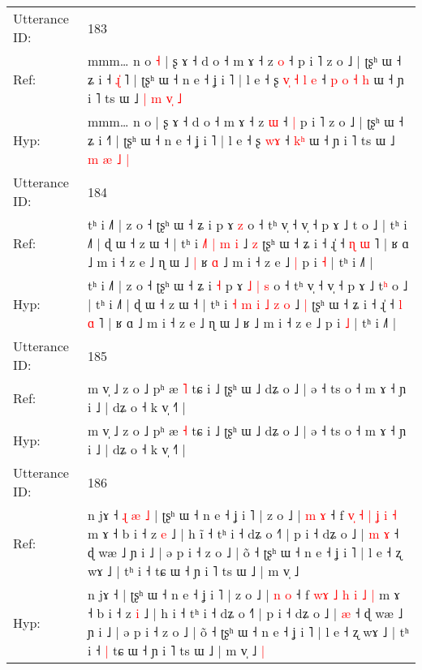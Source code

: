 \documentclass[10pt]{article}
\DeclareRobustCommand{\hl}[1]{{\textcolor{red}{#1}}}
\begin{document}
\begin{longtable}{ll}
 \\
\midrule
Utterance ID: & 183 \\
Ref: & mmm… n o\hl{ }\hl{˧} | ʂ ɤ ˧ d o ˧ m ɤ ˧ z \hl{o} ˧\hl{}\hl{} p i ˥ z o ˩ | ʈʂʰ ɯ ˧ ʑ i ˧\hl{ }\hl{ɻ}\hl{̍}\hl{ }˥ | ʈʂʰ ɯ ˧ n e ˧ ʝ i ˥ | l e ˧ ʂ\hl{ }\hl{v}\hl{̩}\hl{ }\hl{˧} \hl{l}\hl{ }\hl{e} ˧\hl{ }\hl{p}\hl{ }\hl{o} \hl{˧}\hl{ }\hl{h} ɯ ˧ ɲ i ˥ ts ɯ ˩ \hl{|} \hl{m} \hl{v}\hl{̩} \hl{˩}
 \\
Hyp: & mmm… n o\hl{}\hl{} | ʂ ɤ ˧ d o ˧ m ɤ ˧ z \hl{ɯ} ˧\hl{ }\hl{|} p i ˥ z o ˩ | ʈʂʰ ɯ ˧ ʑ i ˧\hl{}\hl{}\hl{}\hl{}˥ | ʈʂʰ ɯ ˧ n e ˧ ʝ i ˥ | l e ˧ ʂ\hl{}\hl{}\hl{}\hl{}\hl{} \hl{}\hl{w}\hl{ɤ} ˧\hl{}\hl{}\hl{}\hl{} \hl{}\hl{k}\hl{ʰ} ɯ ˧ ɲ i ˥ ts ɯ ˩ \hl{m} \hl{æ} \hl{}\hl{˩} \hl{|}
 \\
\midrule
Utterance ID: & 184 \\
Ref: & tʰ i ˩˥ | z o ˧ ʈʂʰ ɯ ˧ ʑ i\hl{}\hl{} p ɤ\hl{}\hl{}\hl{}\hl{} \hl{z} o ˧ tʰ v̩ ˧ v̩ ˧ p ɤ ˩ t\hl{} o ˩ | tʰ i ˩˥ | ɖ ɯ ˧ z ɯ ˧ | tʰ i\hl{}\hl{} \hl{}\hl{˩}\hl{˥} \hl{|} \hl{m} \hl{i} ˩ \hl{z} ʈʂʰ ɯ ˧ ʑ i ˧ ɻ̍ ˧ \hl{ɳ} \hl{ɯ} ˥ | ʁ ɑ ˩ m i ˧ z e ˩ ɳ ɯ ˩\hl{ }\hl{|} ʁ\hl{ }\hl{ɑ} ˩ m i ˧ z e ˩\hl{ }\hl{|} p i \hl{˧} | tʰ i ˩˥ |
 \\
Hyp: & tʰ i ˩˥ | z o ˧ ʈʂʰ ɯ ˧ ʑ i\hl{ }\hl{˧} p ɤ\hl{ }\hl{˩}\hl{ }\hl{|} \hl{s} o ˧ tʰ v̩ ˧ v̩ ˧ p ɤ ˩ t\hl{ʰ} o ˩ | tʰ i ˩˥ | ɖ ɯ ˧ z ɯ ˧ | tʰ i\hl{ }\hl{˧} \hl{m}\hl{ }\hl{i} \hl{˩} \hl{z} \hl{o} ˩ \hl{|} ʈʂʰ ɯ ˧ ʑ i ˧ ɻ̍ ˧ \hl{l} \hl{ɑ} ˥ | ʁ ɑ ˩ m i ˧ z e ˩ ɳ ɯ ˩\hl{}\hl{} ʁ\hl{}\hl{} ˩ m i ˧ z e ˩\hl{}\hl{} p i \hl{˩} | tʰ i ˩˥ |
 \\
\midrule
Utterance ID: & 185 \\
Ref: & m v̩ ˩ z o ˩ pʰ æ \hl{˥} tɕ i ˩ ʈʂʰ ɯ ˩ dʑ o ˩ | ə ˧ ts o ˧ m ɤ ˧ ɲ i ˩ | dʑ o ˧ k v̩ ˧˥ |
 \\
Hyp: & m v̩ ˩ z o ˩ pʰ æ \hl{˧} tɕ i ˩ ʈʂʰ ɯ ˩ dʑ o ˩ | ə ˧ ts o ˧ m ɤ ˧ ɲ i ˩ | dʑ o ˧ k v̩ ˧˥ |
 \\
\midrule
Utterance ID: & 186 \\
Ref: & n jɤ ˧\hl{ }\hl{ɻ}\hl{ }\hl{æ}\hl{ }\hl{˩} | ʈʂʰ ɯ ˧ n e ˧ ʝ i ˥ | z o ˩ | \hl{m} \hl{ɤ} ˧ f \hl{v}\hl{̩} \hl{˧} \hl{|} \hl{ʝ} \hl{i} \hl{˧} m ɤ ˧ b i ˧ z \hl{e} ˩ | h i\hl{̃} ˧ tʰ i ˧ dʑ o ˧˥ | p i ˧ dʑ o ˩ |\hl{ }\hl{m} \hl{ɤ} ˧ ɖ wæ ˩ ɲ i ˩ | ə p i ˧ z o ˩ | õ ˧ ʈʂʰ ɯ ˧ n e ˧ ʝ i ˥ | l e ˧ ʐ wɤ ˩ | tʰ i ˧\hl{}\hl{} tɕ ɯ ˧ ɲ i ˥ ts ɯ ˩ | m v̩ ˩\hl{}\hl{}
 \\
Hyp: & n jɤ ˧\hl{}\hl{}\hl{}\hl{}\hl{}\hl{} | ʈʂʰ ɯ ˧ n e ˧ ʝ i ˥ | z o ˩ | \hl{n} \hl{o} ˧ f \hl{w}\hl{ɤ} \hl{˩} \hl{h} \hl{i} \hl{˩} \hl{|} m ɤ ˧ b i ˧ z \hl{i} ˩ | h i\hl{} ˧ tʰ i ˧ dʑ o ˧˥ | p i ˧ dʑ o ˩ |\hl{}\hl{} \hl{æ} ˧ ɖ wæ ˩ ɲ i ˩ | ə p i ˧ z o ˩ | õ ˧ ʈʂʰ ɯ ˧ n e ˧ ʝ i ˥ | l e ˧ ʐ wɤ ˩ | tʰ i ˧\hl{ }\hl{|} tɕ ɯ ˧ ɲ i ˥ ts ɯ ˩ | m v̩ ˩\hl{ }\hl{|}

\end{longtable}
\end{document}

